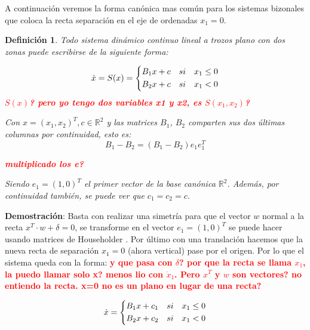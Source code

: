 \documentclass[12pt,a4paper]{report} %
\newtheorem{definicion}{Definición} %
\begin{document}
	 A continuación veremos la forma canónica mas común para los sistemas bizonales que coloca la recta separación en el eje de ordenadas $x_1=0$.
	
	\begin{definicion}
		Todo sistema dinámico continuo lineal a trozos plano con dos zonas puede escribirse de la siguiente forma:
	
	\begin{equation}
		\dot{x}=S(x)=
		\label{eq:lien}
		\scalebox{1}{$\displaystyle
			\left\{
			\begin{aligned}
				B_1x+c\quad si \quad x_1 \leq 0 \\
				B_2x+c\quad si \quad x_1 < 0
			\end{aligned}
			\right.
			$}
	\end{equation}\smallskip
	\textbf{\textcolor{red}{$S(x)$? pero yo tengo dos variables x1 y x2, es $S(x_1,x_2)$? }}
	
	Con $x=(x_1,x_2)^T, c\in \mathbb{R}^2$ y las matrices $B_1$, $B_2$ comparten sus dos últimas columnas por continuidad, esto es:
	\begin{equation}
		B_1-B_2 = \left(B_1-B_2\right)e_1e_1^T 
	\end{equation}\smallskip
	
	\textbf{\textcolor{red}{multiplicado los e?}}
	
	Siendo $e_1=(1,0)^T$ el primer vector de la base canónica $\mathbb{R}^2$. Además, por continuidad también, se puede ver que $c_1=c_2=c$.
    \end{definicion}\smallskip

	
	\textbf{Demostración}: Basta con realizar una simetría para que el vector $w$ normal a la recta $x^T\cdotp w+\delta=0$, se transforme en el vector $e_1=(1,0)^T$ se puede hacer usando matrices de Householder \cite{docvic}. Por último con una translación hacemos que la nueva recta de separación $x_1=0$ (ahora vertical) pase por el origen. Por lo que el sistema queda con la forma:
	\textbf{\textcolor{red}{y que pasa con $\delta$? por que la recta se llama $x_1$, la puedo llamar solo x? menos lio con $\dot{x}_1$. Pero $x^T$ y $w$ son vectores? no entiendo la recta. x=0 no es un plano en lugar de una recta?}}
	
	\begin{equation}
		\dot{x}=
		\label{eq:lien2}
		\scalebox{1}{$\displaystyle
			\left\{
			\begin{aligned}
			B_1x+c_1\quad si \quad x_1 \leq 0 \\
			B_2x+c_2\quad si \quad x_1 < 0
			\end{aligned}
			\right.
			$}
	\end{equation}\smallskip
	
\end{document}
